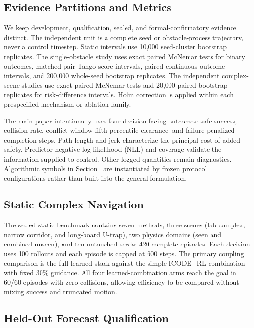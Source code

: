 \documentclass[conference]{IEEEtran}
\newcommand{\reviewbox}[2]{%
    \begingroup
    \setlength{\fboxsep}{0.35pt}%
    \setlength{\fboxrule}{0.45pt}%
    \hyperref[#1]{\fcolorbox{red}{white}{\vphantom{I}#2}}%
    \endgroup}
\newcommand{\reviewref}[1]{\reviewbox{#1}{\ref*{#1}}}
\newcommand{\reviewref}[1]{\ref{#1}}
\begin{document}
\subsection{Evidence Partitions and Metrics}

We keep development, qualification, sealed, and formal-confirmatory evidence distinct. The independent unit is a complete seed or obstacle-process trajectory, never a control timestep. Static intervals use 10,000 seed-cluster bootstrap replicates. The single-obstacle study uses exact paired McNemar tests for binary outcomes, matched-pair Tango score intervals, paired continuous-outcome intervals, and 200,000 whole-seed bootstrap replicates. The independent complex-scene studies use exact paired McNemar tests and 20,000 paired-bootstrap replicates for risk-difference intervals. Holm correction is applied within each prespecified mechanism or ablation family.

The main paper intentionally uses four decision-facing outcomes: safe success, collision rate, conflict-window fifth-percentile clearance, and failure-penalized completion steps. Path length and jerk characterize the principal cost of added safety. Predictor negative log likelihood (NLL) and coverage validate the information supplied to control. Other logged quantities remain diagnostics. Algorithmic symbols in Section~\reviewref{sec:method} are instantiated by frozen protocol configurations rather than built into the general formulation.

\subsection{Static Complex Navigation}

The sealed static benchmark contains seven methods, three scenes (lab complex, narrow corridor, and long-board U-trap), two physics domains (seen and combined unseen), and ten untouched seeds: 420 complete episodes. Each decision uses 100 rollouts and each episode is capped at 600 steps. The primary coupling comparison is the full learned stack against the simple ICODE+RL combination with fixed 30\% guidance. All four learned-combination arms reach the goal in 60/60 episodes with zero collisions, allowing efficiency to be compared without mixing success and truncated motion.

\subsection{Held-Out Forecast Qualification}
\end{document}
